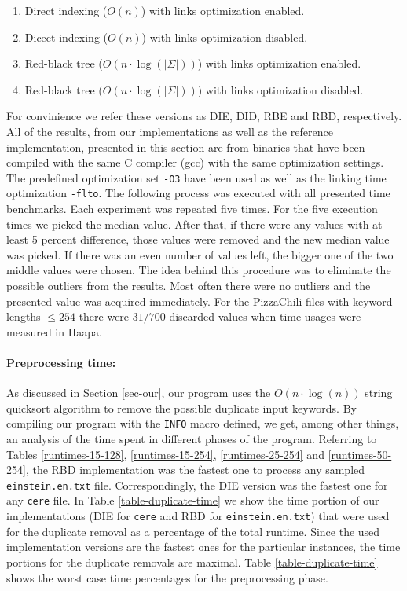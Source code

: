 \documentclass[english,twoside,censored,csm,algorithms-track-2020]{HYthesisML}
\theoremstyle{plain}
\theoremstyle{definition}
\begin{document}


\begin{enumerate}
\item Direct indexing ($O(n)$) with links optimization enabled.
\item Dicect indexing ($O(n)$) with links optimization disabled.
\item Red-black tree ($O(n\cdot\log(|\Sigma|))$) with links optimization enabled.
\item Red-black tree ($O(n\cdot\log(|\Sigma|))$) with links optimization disabled.
\end{enumerate}

For convinience we refer these versions as DIE, DID, RBE and RBD, respectively. All of the results,
from our implementations as well as the reference implementation,
presented in this section are from binaries that have been compiled with the same C
compiler (gcc) with the same optimization settings. The predefined optimization set \texttt{-O3} have
been used as well as the linking time optimization \texttt{-flto}. The following process was executed
with all presented time benchmarks. Each experiment was repeated five times. For
the five execution times we picked the median value. After that, if there were any values with 
at least 5 percent difference, those values were removed and the new median value was picked.
If there was an even number of values left, the bigger one of the two middle values were chosen.
The idea behind this procedure was to eliminate the possible outliers from the results. Most often
there were no outliers and the presented value was acquired immediately. For the PizzaChili files
with keyword lengths $\leq 254$ there were $31/700$ discarded values when time usages were
measured in Haapa.

\paragraph{Preprocessing time:}
As discussed in Section \ref{sec-our}, our program uses the $O(n\cdot\log(n))$ string quicksort
algorithm to remove the possible duplicate input keywords. By compiling our program with the
\texttt{INFO} macro defined, we get, among other things, an analysis of the time spent in different phases
of the program. Referring to Tables \ref{runtimes-15-128}, \ref{runtimes-15-254},
\ref{runtimes-25-254} and \ref{runtimes-50-254}, the RBD implementation was the fastest one
to process any sampled \texttt{einstein.en.txt}
file. Correspondingly, the DIE version was the fastest one for any \texttt{cere} file. In Table
\ref{table-duplicate-time}
we show the time portion of our implementations (DIE for \texttt{cere} and RBD for
\texttt{einstein.en.txt}) that were
used for the duplicate removal as a percentage of the total runtime. Since the used  implementation
versions are the fastest ones for the particular instances, the time portions for the duplicate
removals are maximal. Table \ref{table-duplicate-time} shows the worst case time percentages
for the preprocessing phase.
\end{document}
